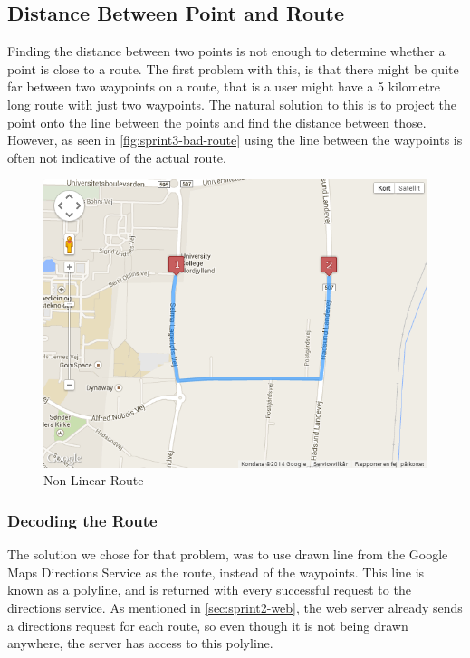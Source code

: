 \subsection{Distance Between Point and Route}
Finding the distance between two points is not enough to determine whether a point is close to a route. The first problem with this, is that there might be quite far between two waypoints on a route, that is a user might have a 5 kilometre long route with just two waypoints. The natural solution to this is to project the point onto the line between the points and find the distance between those. However, as seen in \autoref{fig:sprint3-bad-route} using the line between the waypoints is often not indicative of the actual route.

\begin{figure}[!ht]
	\centering
	\includegraphics[scale=0.5]{img/sprint3br.png}
	\caption{Non-Linear Route}
	\label{fig:sprint3-bad-route}
\end{figure}

\subsubsection{Decoding the Route}
The solution we chose for that problem, was to use drawn line from the Google Maps Directions Service as the route, instead of the waypoints. This line is known as a polyline, and is returned with every successful request to the directions service. As mentioned in \autoref{sec:sprint2-web}, the web server already sends a directions request for each route, so even though it is not being drawn anywhere, the server has access to this polyline. 

